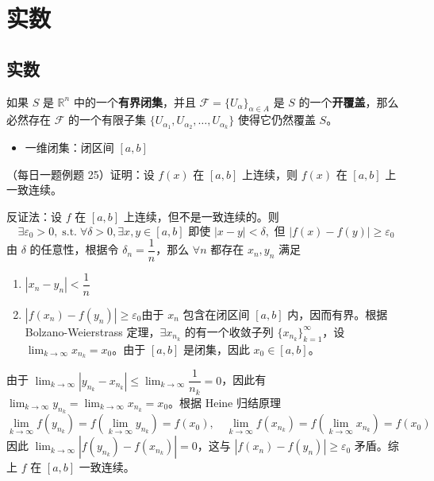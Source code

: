 
\chapter{实数}

\section{实数}

\begin{theorem}如果 $\displaystyle S$ 是 $\displaystyle \mathbb{R}^n$ 中的一个\textbf{有界闭集}，并且 $\displaystyle \mathscr{F} = \lbrace \displaystyle U_{{\alpha}} \rbrace_{{{\alpha}} \in A}$ 是 $\displaystyle S$ 的一个\textbf{开覆盖}，那么必然存在 $\displaystyle \mathscr{F}$ 的一个有限子集 $\displaystyle \lbrace \displaystyle U_{{{\alpha}}_1}, U_{{{\alpha}}_2}, \dots, U_{{{\alpha}}_k} \rbrace$ 使得它仍然覆盖 $\displaystyle S$。

\begin{itemize}
  \item {一维闭集：闭区间 $\displaystyle [a, b]$}
\end{itemize}
\end{theorem}

\begin{theorem}（每日一题例题 25）证明：设 $f(x)$ 在 $[a, b]$ 上连续，则 $f(x)$ 在 $[a, b]$ 上一致连续。

\end{theorem}

反证法：设 $f$ 在 $[a, b]$ 上连续，但不是一致连续的。则
$$
\exists \varepsilon_0 > 0, \operatorname{s.t.} \forall \delta > 0, \exists x, y \in [a, b] \text{ 即使 } |x - y| < \delta, \text{ 但 } |f(x) - f(y)| \geqslant \varepsilon_0
$$
由 $\delta$ 的任意性，根据令 $\delta_n = \dfrac{1}{n}$，那么 $\forall n$ 都存在 $x_n, y_n$ 满足

\begin{enumerate}
  \item {$|x_n - y_n| < \dfrac{1}{n}$}\item {$|f(x_n) - f(y_n)| \geqslant \varepsilon_0$由于 $x_n$ 包含在闭区间 $[a, b]$ 内，因而有界。根据 Bolzano-Weierstrass 定理，$\exists x_{n_k}$ 的有一个收敛子列 $\{x_{n_k}\}_{k=1}^{\infty}$，设 $\displaystyle \lim_{k \to \infty} x_{n_k} = x_0$。由于 $[a, b]$ 是闭集，因此 $x_0 \in [a, b]$。}
\end{enumerate}
由于 $\displaystyle \lim_{k \to \infty} |y_{n_k} - x_{n_k}| \leqslant \lim_{k \to \infty} \dfrac{1}{n_k} = 0$，因此有 $\displaystyle \lim_{k \to \infty} y_{n_k} = \lim_{k \to \infty} x_{n_k} = x_0$。根据 Heine 归结原理
$$
\lim_{k \to \infty} f(y_{n_k}) = f(\lim_{k \to \infty} y_{n_k}) = f(x_0), \quad \lim_{k \to \infty} f(x_{n_k}) = f(\lim_{k \to \infty} x_{n_k}) = f(x_0)
$$
因此 $\displaystyle \lim_{k \to \infty} |f(y_{n_k}) - f(x_{n_k})| = 0$，这与 $|f(x_n) - f(y_n)| \geqslant \varepsilon_0$ 矛盾。综上 $f$ 在 $[a, b]$ 一致连续。

